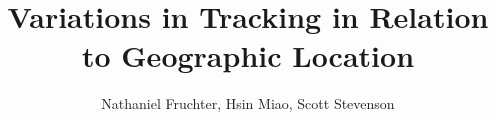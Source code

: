 \documentclass[12pt,draft,onecolumn]{IEEEtran}
\begin{document}
%
\title{Variations in Tracking in Relation to Geographic Location}
%
%
%

\author{ Nathaniel Fruchter,
        Hsin Miao,
        Scott Stevenson
        }%
% 
%



% 




\end{document}

